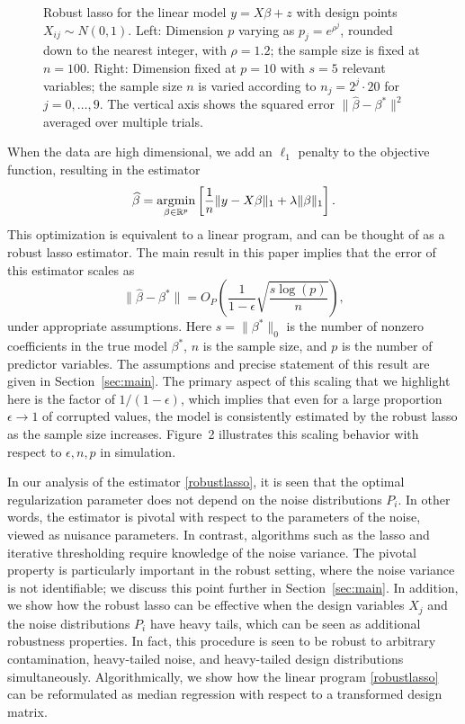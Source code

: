 \begin{figure}[t]
\begin{center}
\begin{tabular}{cc}
    \end{tabular}
  \end{center}
\caption{Robust lasso for the linear model  $y=X\beta + z$ with design points $X_{ij}\sim N(0,1)$.
Left: Dimension $p$ varying as $p_{j} = e^{\rho^j}$, rounded down to the nearest integer, with $\rho=1.2$; the sample size is fixed at $n=100$. Right: Dimension fixed at $p=10$ with $s=5$ relevant variables; the sample size $n$ is varied according to
$n_j = 2^j \cdot 20$ for $j=0,\ldots, 9$. The vertical axis shows the squared error $\|\hat \beta - \beta^*\|^2$ averaged over multiple trials.}
\end{figure}

When the data are high dimensional, we add an $\ell_1$ penalty to the objective function, resulting in the estimator
\begin{equation}
  \wh{\beta}=\argmin_{\beta\in\mathbb{R}^p}\left[\frac{1}{n}\|y-X\beta\|_1+\lambda\|\beta\|_1\right].
  \label{robustlasso}
\end{equation}
This optimization is equivalent to a linear program, and can be thought of as a robust lasso estimator. The main result in this paper implies that the error of this estimator scales as
\begin{equation}
  \|\hat \beta - \beta^*\|  = O_P\left(\frac{1}{1-\epsilon} \sqrt{\frac{s\log(p)}{n}}\right),
\end{equation}
under appropriate assumptions.
Here $s = \|\beta^*\|_0$ is the number of nonzero coefficients in the true model $\beta^*$, $n$ is the sample size, and $p$ is the number of predictor variables. The assumptions and precise statement of this result are given in Section~\ref{sec:main}. The primary aspect of this scaling that we highlight here is the factor of $1/(1-\epsilon)$, which implies that even for a large proportion $\epsilon \to 1$ of corrupted values, the model is consistently estimated by the robust lasso as the sample size increases. Figure~2 illustrates this scaling behavior with respect to $\epsilon, n, p$ in simulation.

In our analysis of the estimator \eqref{robustlasso}, it is seen that the optimal regularization parameter does not depend on the noise distributions $P_i$. In other words, the
estimator is pivotal with respect to the parameters of the noise, viewed as nuisance parameters.
In contrast, algorithms such as the lasso \citep{bickel2009simultaneous} and iterative thresholding \citep{suggala2019adaptive} require knowledge of the noise variance.
The pivotal property is particularly important in the robust setting, where the
noise variance is not identifiable; we discuss this point further in Section~\ref{sec:main}.
In addition, we show how the robust lasso can be effective when the design variables $X_j$ and the noise distributions $P_i$ have heavy tails, which can be seen as additional robustness properties.
In fact, this procedure is seen to be robust to arbitrary contamination, heavy-tailed noise, and heavy-tailed design distributions simultaneously. Algorithmically, we show how the linear program \eqref{robustlasso} can be reformulated as median regression with respect to a transformed design matrix.

